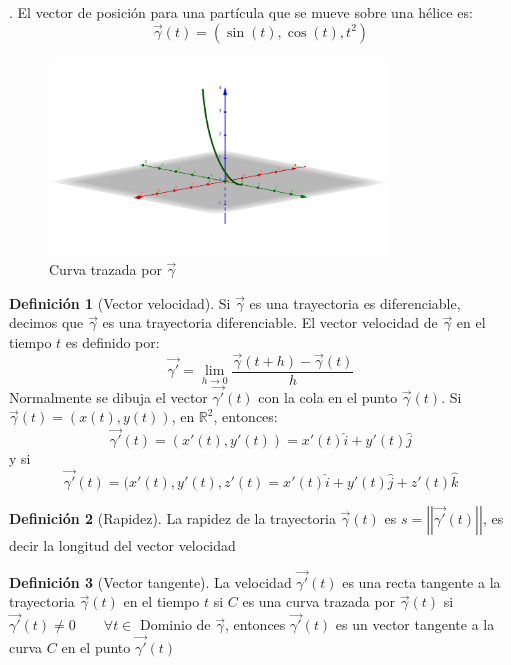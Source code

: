 \documentclass[letterpaper]{article}
\providecommand{\norm}[1]{\left|\left|#1\right|\right|}
\newcommand{\R}{\mathds{R}}
\renewcommand{\*}{\cdot}
\theoremstyle{definition}
\newtheorem{definition}{Definición}
\begin{document}
\newpage
{}. El vector de posición para una partícula que se mueve sobre una hélice es: $$\vec{\gamma}(t) = (\sin(t), \cos(t), t^2)$$
\begin{figure}[h]
	\centering
	\includegraphics[width=0.8\textwidth]{img/Proyecto4.png}
	\caption{Curva trazada por $ \vec{\gamma} $}
\end{figure}
\begin{definition}[Vector velocidad]
	Si $ \vec{\gamma} $ es una trayectoria  es diferenciable, decimos que $ \vec{\gamma} $ es una trayectoria diferenciable. El vector velocidad de $ \vec{\gamma} $ en el tiempo $ t $ es definido por: \[ \vec{\gamma'} = \lim\limits_{h \to 0} \dfrac{\vec{\gamma}(t + h) - \vec{\gamma}(t)}{h} \]
	Normalmente se dibuja el vector $ \vec{\gamma'}(t) $ con la cola en el punto $ \vec{\gamma}(t) $. Si $\vec{\gamma}(t) = (x(t),y(t)) $, en $ \R^2 $, entonces:
	\[ \vec{\gamma'}(t) = (x'(t), y'(t)) = x'(t)\hat{i} + y'(t)\hat{j} \] y si \[ \vec{\gamma'}(t) = (x'(t), y'(t), z'(t) = x'(t)\hat{i} + y'(t)\hat{j} + z'(t)\hat{k} \]
\end{definition}
\begin{definition}[Rapidez]
	La rapidez de la trayectoria $ \vec{\gamma}(t) $ es $ s = \norm{\vec{\gamma'}(t)} $, es decir la longitud del vector velocidad
\end{definition}
\begin{definition}[Vector tangente]
	La velocidad $ \vec{\gamma'}(t) $ es una recta tangente a la trayectoria $ \vec{\gamma}(t) $ en el tiempo $ t $ si $ C $ es una curva trazada por $ \vec{\gamma}(t) $  si $ \vec{\gamma'}(t) \neq 0 \qquad \forall t \in $ Dominio de $ \vec{\gamma} $, entonces $ \vec{\gamma'}(t) $ es un vector tangente a la curva $ C $ en el punto $ \vec{\gamma'}(t) $
\end{definition}
\end{document}
